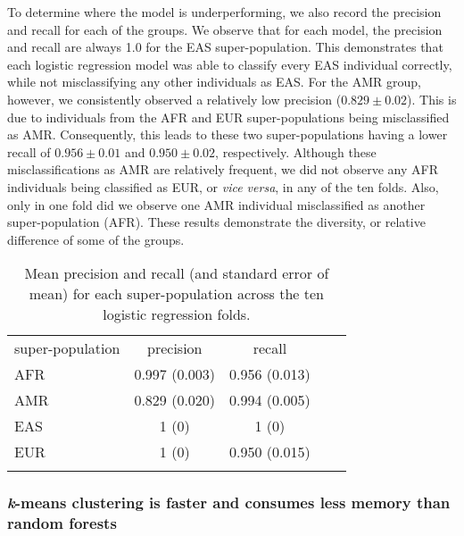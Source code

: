 \documentclass{llncs}
\newcommand{\kMeans}{\textit{k}-means }
\begin{document}
{To determine where the model is underperforming, we also record the precision and recall for each of the groups.
We observe that for each model, the precision and recall are always 1.0 for the EAS super-population.
This demonstrates that each logistic regression model was able to classify every EAS individual correctly, while not misclassifying any other individuals as EAS.
For the AMR group, however, we consistently observed a relatively low precision (\(0.829 \pm{} 0.02 \)).
This is due to individuals from the AFR and EUR super-populations being misclassified as AMR.
Consequently, this leads to these two super-populations having a lower recall of \(0.956 \pm 0.01 \) and \(0.950 \pm 0.02 \), respectively.
Although these misclassifications as AMR are relatively frequent, we did not observe any AFR individuals being classified as EUR, or {\it vice versa}, in any of the ten folds.
Also, only in one fold did we observe one AMR individual misclassified as another super-population (AFR).
These results demonstrate the diversity, or relative difference of some of the groups. 

\begin{table}
\caption{Mean precision and recall (and standard error of mean) for each super-population across the ten logistic regression folds.}
\begin{center}
\renewcommand{\arraystretch}{1.4}
\setlength\tabcolsep{3pt}
\begin{tabular}{lcccc}
\hline\noalign{\smallskip}
super-population  & precision & recall \\
AFR  & 0.997 (0.003) & 0.956 (0.013) \\
AMR & 0.829 (0.020) & 0.994 (0.005) \\
EAS  & 1 (0) & 1 (0) \\
EUR  & 1 (0) & 0.950 (0.015) \\
\noalign{\smallskip}
\hline
\end{tabular}
\end{center}
\end{table}







\subsubsection{\kMeans{} clustering is faster and consumes less memory than random forests}

}
\end{document}
